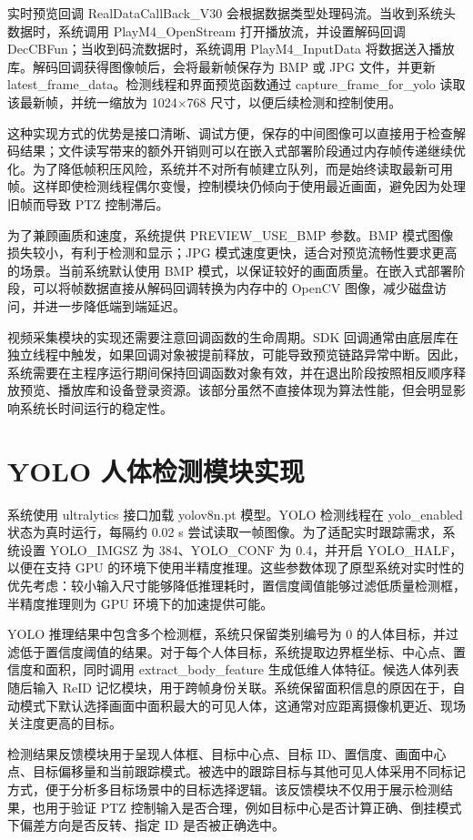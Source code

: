 实时预览回调 RealDataCallBack\_V30 会根据数据类型处理码流。当收到系统头数据时，系统调用 PlayM4\_OpenStream 打开播放流，并设置解码回调 DecCBFun；当收到码流数据时，系统调用 PlayM4\_InputData 将数据送入播放库。解码回调获得图像帧后，会将最新帧保存为 BMP 或 JPG 文件，并更新 latest\_frame\_data。检测线程和界面预览函数通过 capture\_frame\_for\_yolo 读取该最新帧，并统一缩放为 1024×768 尺寸，以便后续检测和控制使用。

这种实现方式的优势是接口清晰、调试方便，保存的中间图像可以直接用于检查解码结果；文件读写带来的额外开销则可以在嵌入式部署阶段通过内存帧传递继续优化。为了降低帧积压风险，系统并不对所有帧建立队列，而是始终读取最新可用帧。这样即使检测线程偶尔变慢，控制模块仍倾向于使用最近画面，避免因为处理旧帧而导致 PTZ 控制滞后。

为了兼顾画质和速度，系统提供 PREVIEW\_USE\_BMP 参数。BMP 模式图像损失较小，有利于检测和显示；JPG 模式速度更快，适合对预览流畅性要求更高的场景。当前系统默认使用 BMP 模式，以保证较好的画面质量。在嵌入式部署阶段，可以将帧数据直接从解码回调转换为内存中的 OpenCV 图像，减少磁盘访问，并进一步降低端到端延迟。

视频采集模块的实现还需要注意回调函数的生命周期。SDK 回调通常由底层库在独立线程中触发，如果回调对象被提前释放，可能导致预览链路异常中断。因此，系统需要在主程序运行期间保持回调函数对象有效，并在退出阶段按照相反顺序释放预览、播放库和设备登录资源。该部分虽然不直接体现为算法性能，但会明显影响系统长时间运行的稳定性。

\section{YOLO 人体检测模块实现}

系统使用 ultralytics 接口加载 yolov8n.pt 模型。YOLO 检测线程在 yolo\_enabled 状态为真时运行，每隔约 0.02 s 尝试读取一帧图像。为了适配实时跟踪需求，系统设置 YOLO\_IMGSZ 为 384、YOLO\_CONF 为 0.4，并开启 YOLO\_HALF，以便在支持 GPU 的环境下使用半精度推理。这些参数体现了原型系统对实时性的优先考虑：较小输入尺寸能够降低推理耗时，置信度阈值能够过滤低质量检测框，半精度推理则为 GPU 环境下的加速提供可能。

YOLO 推理结果中包含多个检测框，系统只保留类别编号为 0 的人体目标，并过滤低于置信度阈值的结果。对于每个人体目标，系统提取边界框坐标、中心点、置信度和面积，同时调用 extract\_body\_feature 生成低维人体特征。候选人体列表随后输入 ReID 记忆模块，用于跨帧身份关联。系统保留面积信息的原因在于，自动模式下默认选择画面中面积最大的可见人体，这通常对应距离摄像机更近、现场关注度更高的目标。

检测结果反馈模块用于呈现人体框、目标中心点、目标 ID、置信度、画面中心点、目标偏移量和当前跟踪模式。被选中的跟踪目标与其他可见人体采用不同标记方式，便于分析多目标场景中的目标选择逻辑。该反馈模块不仅用于展示检测结果，也用于验证 PTZ 控制输入是否合理，例如目标中心是否计算正确、倒挂模式下偏差方向是否反转、指定 ID 是否被正确选中。

